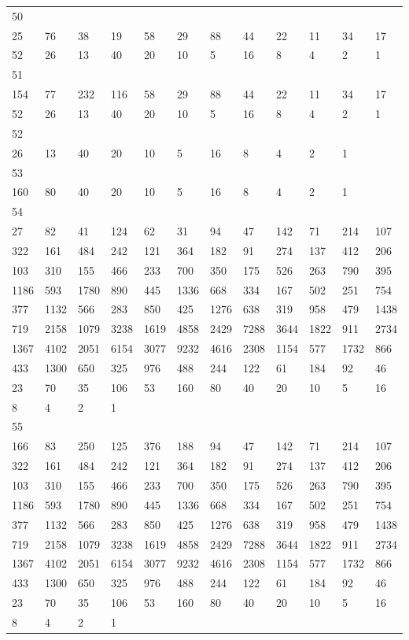 \begin{longtable}{llllllllllll}
50&&&&&&&&&&&\\
25& 76& 38& 19& 58& 29& 88& 44& 22& 11& 34& 17\\
52& 26& 13& 40& 20& 10& 5& 16& 8& 4& 2& 1\\

51&&&&&&&&&&&\\
154& 77& 232& 116& 58& 29& 88& 44& 22& 11& 34& 17\\
52& 26& 13& 40& 20& 10& 5& 16& 8& 4& 2& 1\\

52&&&&&&&&&&&\\
26& 13& 40& 20& 10& 5& 16& 8& 4& 2& 1& \\

53&&&&&&&&&&&\\
160& 80& 40& 20& 10& 5& 16& 8& 4& 2& 1& \\

54&&&&&&&&&&&\\
27& 82& 41& 124& 62& 31& 94& 47& 142& 71& 214& 107\\
322& 161& 484& 242& 121& 364& 182& 91& 274& 137& 412& 206\\
103& 310& 155& 466& 233& 700& 350& 175& 526& 263& 790& 395\\
1186& 593& 1780& 890& 445& 1336& 668& 334& 167& 502& 251& 754\\
377& 1132& 566& 283& 850& 425& 1276& 638& 319& 958& 479& 1438\\
719& 2158& 1079& 3238& 1619& 4858& 2429& 7288& 3644& 1822& 911& 2734\\
1367& 4102& 2051& 6154& 3077& 9232& 4616& 2308& 1154& 577& 1732& 866\\
433& 1300& 650& 325& 976& 488& 244& 122& 61& 184& 92& 46\\
23& 70& 35& 106& 53& 160& 80& 40& 20& 10& 5& 16\\
8& 4& 2& 1& \\

55&&&&&&&&&&&\\
166& 83& 250& 125& 376& 188& 94& 47& 142& 71& 214& 107\\
322& 161& 484& 242& 121& 364& 182& 91& 274& 137& 412& 206\\
103& 310& 155& 466& 233& 700& 350& 175& 526& 263& 790& 395\\
1186& 593& 1780& 890& 445& 1336& 668& 334& 167& 502& 251& 754\\
377& 1132& 566& 283& 850& 425& 1276& 638& 319& 958& 479& 1438\\
719& 2158& 1079& 3238& 1619& 4858& 2429& 7288& 3644& 1822& 911& 2734\\
1367& 4102& 2051& 6154& 3077& 9232& 4616& 2308& 1154& 577& 1732& 866\\
433& 1300& 650& 325& 976& 488& 244& 122& 61& 184& 92& 46\\
23& 70& 35& 106& 53& 160& 80& 40& 20& 10& 5& 16\\
8& 4& 2& 1& \\


\end{longtable}
